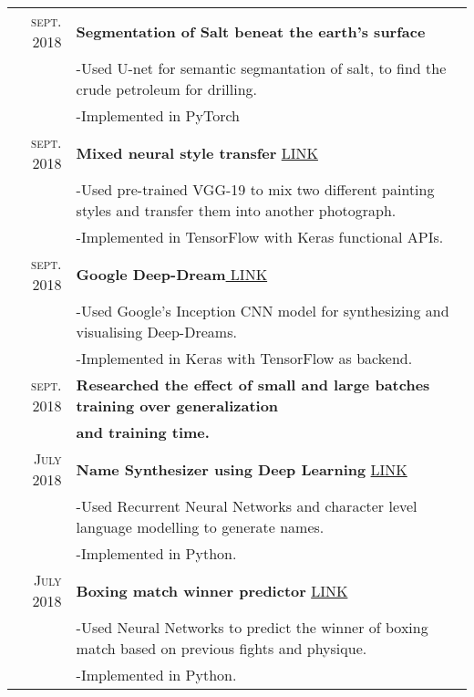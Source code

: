 \documentclass[a4paper,5pt]{article}
\begin{document}
\begin{tabular}{rl}	
 \textsc{sept.} 2018 & \textbf{Segmentation of Salt beneat the earth's surface}\\
 &\footnotesize{\textsc{-}Used U-net for semantic segmantation of salt, to find the crude petroleum for drilling. }\\
 &\footnotesize{\textsc{-}Implemented in PyTorch}
 \vspace{0.0625cm}\\
 \textsc{sept.} 2018 & \textbf{Mixed neural style transfer }\footnotesize{\href{https://github.com/Iamnotabear/Neural-Style-Transfer/blob/master/neural_style_mix_transfer.ipynb}{LINK}}\\
 &\footnotesize{\textsc{-}Used pre-trained VGG-19 to mix two different painting styles and transfer them into another photograph.}\\
 &\footnotesize{\textsc{-}Implemented in TensorFlow with Keras functional APIs.}
 \vspace{0.0625cm}\\
\textsc{sept.} 2018 & \textbf{Google Deep-Dream}\footnotesize{\href{https://github.com/Iamnotabear/Deep_dream/blob/master/deep_dream_keras.ipynb}{ LINK}}\\
 &\footnotesize{\textsc{-}Used Google's Inception CNN model for synthesizing and visualising Deep-Dreams. }\\
 &\footnotesize{\textsc{-}Implemented in Keras with TensorFlow as backend.}
 \vspace{0.0625cm}\\
 \textsc{sept.} 2018 & \textbf{Researched the effect of small and large batches training over generalization} \\
& \textbf{and training time.}
 \vspace{0.0625cm}\\
\textsc{July} 2018 & \textbf{Name Synthesizer using Deep Learning }\footnotesize{\href{https://github.com/Iamnotabear/old_repos/blob/master/female-name-generator-CNN_and_LSTM--master/rnn_model.ipynb}{LINK}}\\
 &\footnotesize{\textsc{-}Used Recurrent Neural Networks and character level language modelling to generate names. }\\
 &\footnotesize{\textsc{-}Implemented in Python.}
 \vspace{0.0625cm}\\
\textsc{July} 2018 & \textbf{Boxing match winner predictor }\footnotesize{\href{https://github.com/Iamnotabear/old_repos/blob/master/deep_neural_net-for-Boxing_match-master/deep_model.ipynb}{LINK}}\\
 &\footnotesize{\textsc{-}Used Neural Networks to predict the winner of boxing match based on previous fights and physique. }\\
 &\footnotesize{\textsc{-}Implemented in Python.}\\

\end{tabular} 
\end{document}
